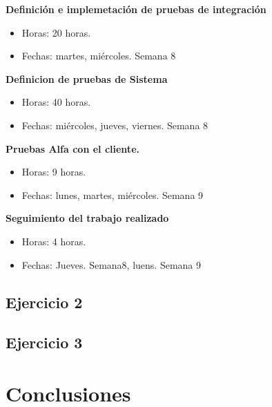 \documentclass[paper=a4, fontsize=11pt, spanish]{scrartcl}
\numberwithin{equation}{section} %
\numberwithin{figure}{section} %
\numberwithin{table}{section} %
\begin{document}
\textbf{Definición e implemetación de pruebas de integración }
\begin{itemize}
  \item Horas: 20 horas.
  \item Fechas: martes, miércoles. Semana 8
\end{itemize}

\textbf{Definicion de pruebas de Sistema }
\begin{itemize}
  \item Horas: 40 horas.
  \item Fechas: miércoles, jueves, viernes. Semana 8
\end{itemize}

\textbf{Pruebas Alfa con el cliente.}
\begin{itemize}
  \item Horas: 9 horas.
  \item Fechas: lunes, martes, miércoles. Semana 9
\end{itemize}

\textbf{Seguimiento del trabajo realizado}
\begin{itemize}
  \item Horas: 4 horas.
  \item Fechas: Jueves. Semana8, luens. Semana 9
\end{itemize}

\subsection{Ejercicio 2}
\subsection{Ejercicio 3}
\section{Conclusiones}
\end{document}
